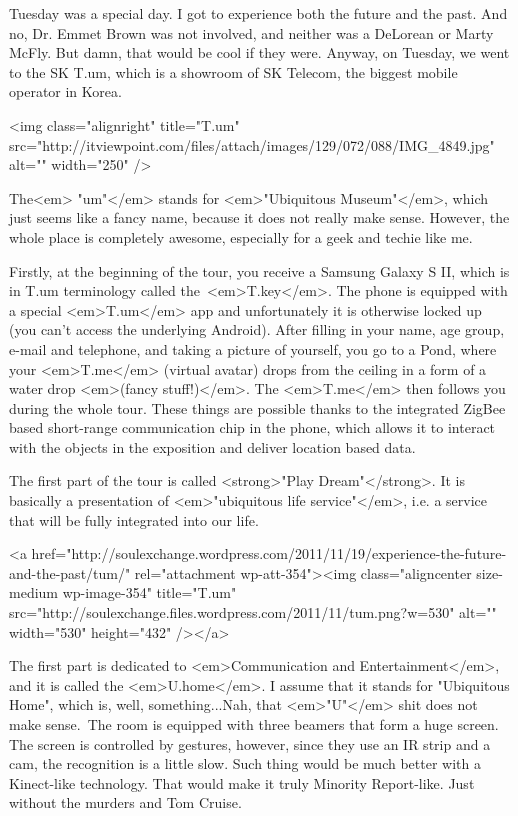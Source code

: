 \begin{post}
	\begin{content}
Tuesday was a special day. I got to experience both the future and the past. And no, Dr. Emmet Brown was not involved, and neither was a DeLorean or Marty McFly. But damn, that would be cool if they were. Anyway, on Tuesday, we went to the SK T.um, which is a showroom of SK Telecom, the biggest mobile operator in Korea.

<img class="alignright" title="T.um" src="http://itviewpoint.com/files/attach/images/129/072/088/IMG_4849.jpg" alt="" width="250" />

The<em> "um"</em> stands for <em>"Ubiquitous Museum"</em>, which just seems like a fancy name, because it does not really make sense. However, the whole place is completely awesome, especially for a geek and techie like me.

Firstly, at the beginning of the tour, you receive a Samsung Galaxy S II, which is in T.um terminology called the <em>T.key</em>. The phone is equipped with a special <em>T.um</em> app and unfortunately it is otherwise locked up (you can't access the underlying Android). After filling in your name, age group, e-mail and telephone, and taking a picture of yourself, you go to a Pond, where your <em>T.me</em> (virtual avatar) drops from the ceiling in a form of a water drop <em>(fancy stuff!)</em>. The <em>T.me</em> then follows you during the whole tour. These things are possible thanks to the integrated ZigBee based short-range communication chip in the phone, which allows it to interact with the objects in the exposition and deliver location based data.

The first part of the tour is called <strong>"Play Dream"</strong>. It is basically a presentation of <em>"ubiquitous life service"</em>, i.e. a service that will be fully integrated into our life.

<a href="http://soulexchange.wordpress.com/2011/11/19/experience-the-future-and-the-past/tum/" rel="attachment wp-att-354"><img class="aligncenter size-medium wp-image-354" title="T.um" src="http://soulexchange.files.wordpress.com/2011/11/tum.png?w=530" alt="" width="530" height="432" /></a>

The first part is dedicated to <em>Communication and Entertainment</em>, and it is called the <em>U.home</em>. I assume that it stands for "Ubiquitous Home", which is, well, something...Nah, that <em>"U"</em> shit does not make sense. The room is equipped with three beamers that form a huge screen. The screen is controlled by gestures, however, since they use an IR strip and a cam, the recognition is a little slow. Such thing would be much better with a Kinect-like technology. That would make it truly Minority Report-like. Just without the murders and Tom Cruise.


\end{content}
\end{post}
